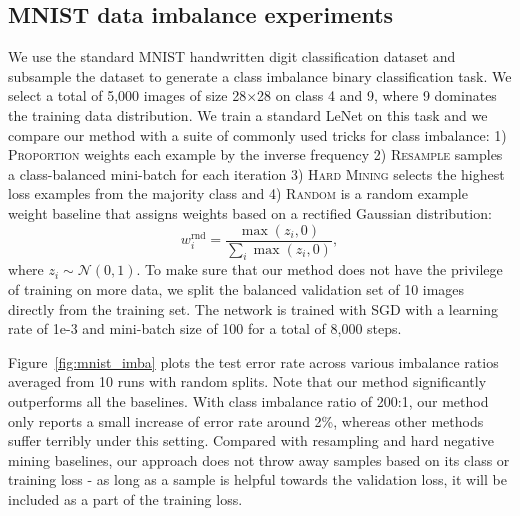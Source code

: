 
\subsection{MNIST data imbalance experiments} 

We use the standard MNIST handwritten digit classification dataset and subsample the dataset to
generate a class imbalance binary classification  task. We select a total of 5,000 images of size
28$\times$28 on class 4 and 9, where 9 dominates the training data distribution. We train a standard
LeNet on this task and we compare our method with a suite of commonly used tricks for class
imbalance: 1) \textsc{Proportion} weights each example by the inverse frequency 2) \textsc{Resample}
samples a class-balanced mini-batch for each iteration 3) \textsc{Hard Mining} selects the highest
loss examples from the majority class and 4) \textsc{Random} is a random example weight baseline
that assigns weights based on a rectified Gaussian distribution:
\begin{equation}
w_i^{\text{rnd}} = \frac{\max(z_i, 0)}{\sum_i \max(z_i, 0)},
\label{eq:randomwts}
\end{equation}
where $z_i \sim \mathcal{N}(0, 1)$.
To make sure that our method does
not have the privilege of training on more data, we split the balanced validation set of 10 images
directly from the training set. The network is trained with SGD with a learning rate of 1e-3 and
mini-batch size of 100 for a total of 8,000 steps.

Figure~\ref{fig:mnist_imba} plots the test error rate across various imbalance ratios averaged from
10 runs with random splits. Note that our method significantly outperforms all the baselines. With
class imbalance ratio of 200:1, our method only reports a small increase of error rate around 2\%,
whereas other methods suffer terribly under this setting. Compared with resampling and hard negative
mining baselines, our approach does not throw away samples based on its class or training loss - as
long as a sample is helpful towards the validation loss, it will be included as a part of the
training loss.


